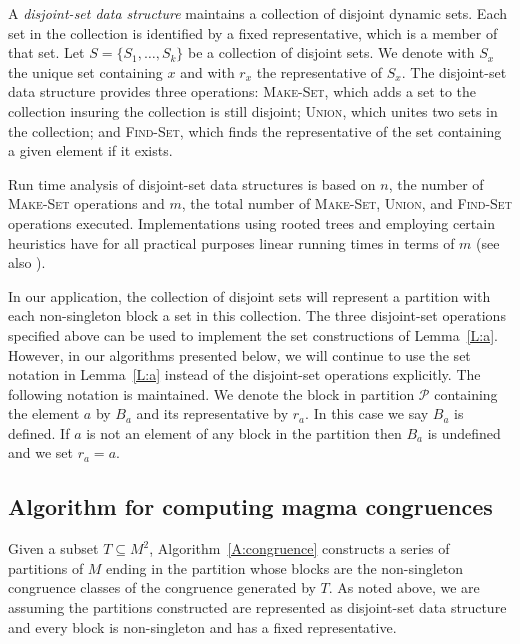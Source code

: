 \documentclass{acmconf}
\begin{document}
A \emph{disjoint-set data structure} maintains a collection of
disjoint dynamic sets.  Each set in the collection 
is identified by a fixed representative, which is a member of that set.  
Let $S=\{S_1,\dots,S_k\}$ be a collection of disjoint sets. We
denote with $S_x$ the unique set containing $x$ and with $r_x$ the
representative of $S_x$. 
The disjoint-set data structure provides three operations:
\textsc{Make-Set}, which adds a set to the collection insuring
the collection is still disjoint;  \textsc{Union},
which unites two sets in the collection;  
and \textsc{Find-Set}, which finds the representative of the set containing
a given element if it exists.

Run time analysis of disjoint-set data structures
is based on $n$,
the number of \textsc{Make-Set} operations and $m$, the total
number of \textsc{Make-Set}, \textsc{Union}, and \textsc{Find-Set} operations
executed. Implementations using rooted trees and employing 
certain heuristics have for all practical purposes
linear running times in terms of $m$
\cite{pT75} (see also \cite{bCLR90}).

In our application, the 
collection of disjoint sets will 
represent a partition with 
each non-singleton block a set in this collection.
The three disjoint-set operations specified above can be used
to implement the set constructions of Lemma~\ref{L:a}.
However, in our algorithms presented below, we will continue to
use the set notation in Lemma~\ref{L:a} instead of the 
disjoint-set operations explicitly.
The following notation is maintained. 
We denote the block in partition
$\mathcal P$ containing the element $a$ by $B_a$ and its
representative by $r_a$. In this case we say $B_a$ is defined.  
If $a$ is not an element of any block in the partition
then $B_a$ is undefined and we set $r_a=a$.  

\subsection{Algorithm for computing magma congruences}
Given a subset $T\subseteq M^2$, Algorithm~\ref{A:congruence} 
constructs a series of partitions of $M$ ending in the 
partition whose blocks are the non-singleton congruence classes
of the congruence generated by $T$. As noted above, we are
assuming the partitions constructed are represented as disjoint-set data
structure and every block is non-singleton and 
has a fixed representative.
\end{document}
